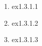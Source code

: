 \documentclass {article}
\begin{document}
	\setcounter{section}{1}
	\setcounter{subsection}{3}
	\setcounter{subsubsection}{0}
	\subsubsection{}
	\begin{enumerate}
		\item  {ex1.3.1.1}
		\item  {ex1.3.1.2}
		\item  {ex1.3.1.3}
	\end{enumerate}
\end{document}
